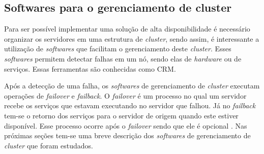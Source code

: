 

\subsection{Softwares para o gerenciamento de cluster}
\label{section:toolcluster}

Para ser possível implementar uma solução de alta disponibilidade é necessário organizar os servidores em uma estrutura de \textit{cluster},
sendo assim, é interessante a utilização de \textit{softwares} que facilitam o gerenciamento deste \textit{cluster}. Esses \textit{softwares} 
permitem detectar falhas em um nó, sendo elas de \textit{hardware} ou de serviços. Essas ferramentas são conhecidas como \ac{CRM}. 

Após a detecção de uma falha, os \textit{softwares} de gerenciamento de \textit{cluster} executam operações de \textit{failover} e 
\textit{failback}. O \textit{failover} é um processo no qual um servidor recebe os serviços que estavam executando no servidor que falhou. 
Já no \textit{failback} tem-se o retorno dos serviços para o servidor de origem quando este estiver disponível. Esse processo ocorre após o 
\textit{failover} sendo que ele é opcional \cite{bassan2008}. Nas próximas seções tem-se uma breve descrição dos \textit{softwares} de 
gerenciamento de \textit{cluster} que foram estudados.


